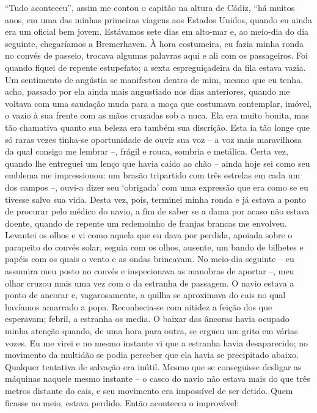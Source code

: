 ``Tudo aconteceu'', assim me contou o capitão na altura de Cádiz, ``há
muitos anos, em uma das minhas primeiras viagens aos Estados Unidos,
quando eu ainda era um oficial bem jovem. Estávamos sete dias em
alto-mar e, ao meio-dia do dia seguinte, chegaríamos a Bremerhaven. À
hora costumeira, eu fazia minha ronda no convés de passeio, trocava
algumas palavras aqui e ali com os passageiros. Foi quando fiquei de
repente estupefato; a sexta espreguiçadeira da fila estava vazia. Um
sentimento de angústia se manifestou dentro de mim, mesmo que eu tenha,
acho, passado por ela ainda mais angustiado nos dias anteriores, quando
me voltava com uma saudação muda para a moça que costumava
contemplar, imóvel, o vazio à sua frente com as mãos cruzadas
sob a nuca. Ela era muito bonita, mas tão chamativa quanto
sua beleza era também sua discrição. Esta ia tão longe que só raras
vezes tinha-se oportunidade de ouvir sua voz -- a voz mais maravilhosa
da qual consigo me lembrar --, frágil e rouca, sombria e metálica. Certa
vez, quando lhe entreguei um lenço que havia caído ao chão -- ainda hoje
sei como seu emblema me impressionou: um brasão tripartido com três
estrelas em cada um dos campos --, ouvi-a dizer seu `obrigada' com uma
expressão que era como se eu tivesse salvo sua vida. Desta vez, pois,
terminei minha ronda e já estava a ponto de procurar pelo médico do
navio, a fim de saber se a dama por acaso não estava doente, quando de
repente um redemoinho de franjas brancas me envolveu. Levantei os olhos
e vi como aquela que eu dava por perdida, apoiada sobre o parapeito do
convés solar, seguia com os olhos, ausente, um bando de bilhetes e
papéis com os quais o vento e as ondas brincavam. No meio-dia seguinte
-- eu assumira meu posto no convés e inspecionava as manobras de aportar
--, meu olhar cruzou mais uma vez com o da estranha de passagem. O navio
estava a ponto de ancorar e, vagarosamente, a quilha se aproximava do
cais no qual havíamos amarrado a popa. Reconhecia-se com nitidez a
feição dos que esperavam; febril, a estranha os media. O baixar das
âncoras havia ocupado minha atenção quando, de uma hora para outra, se
ergueu um grito em várias vozes. Eu me virei e no mesmo instante vi que
a estranha havia desaparecido; no movimento da multidão se podia
perceber que ela havia se precipitado abaixo. Qualquer tentativa de
salvação era inútil. Mesmo que se conseguisse desligar as máquinas
naquele mesmo instante -- o casco do navio não estava mais do que três
metros distante do cais, e seu movimento era impossível de ser detido.
Quem ficasse no meio, estava perdido. Então aconteceu o improvável:
